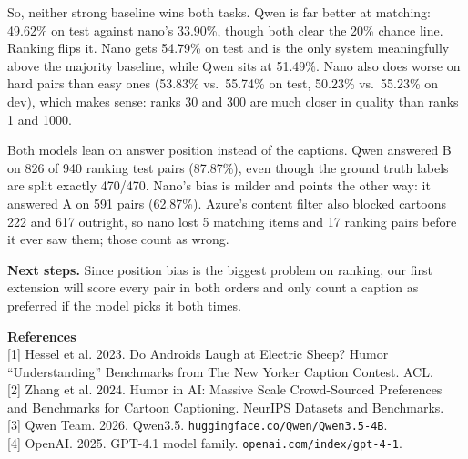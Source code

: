 \documentclass[10pt]{article}
\begin{document}
So, neither strong baseline wins both tasks. Qwen is far better at matching: 49.62\% on test against nano's 33.90\%, though both clear the 20\% chance line. Ranking flips it. Nano gets 54.79\% on test and is the only system meaningfully above the majority baseline, while Qwen sits at 51.49\%. Nano also does worse on hard pairs than easy ones (53.83\% vs.\ 55.74\% on test, 50.23\% vs.\ 55.23\% on dev), which makes sense: ranks 30 and 300 are much closer in quality than ranks 1 and 1000. \par

Both models lean on answer position instead of the captions. Qwen answered B on 826 of 940 ranking test pairs (87.87\%), even though the ground truth labels are split exactly 470/470. Nano's bias is milder and points the other way: it answered A on 591 pairs (62.87\%). Azure's content filter also blocked cartoons 222 and 617 outright, so nano lost 5 matching items and 17 ranking pairs before it ever saw them; those count as wrong. \par

\textbf{Next steps.} Since position bias is the biggest problem on ranking, our first extension will score every pair in both orders and only count a caption as preferred if the model picks it both times. \par

\vspace{-0.5em}
{\small
\textbf{References}\\
{[1]} Hessel et al. 2023. Do Androids Laugh at Electric Sheep? Humor ``Understanding'' Benchmarks from The New Yorker Caption Contest. ACL.\\
{[2]} Zhang et al. 2024. Humor in AI: Massive Scale Crowd-Sourced Preferences and Benchmarks for Cartoon Captioning. NeurIPS Datasets and Benchmarks.\\
{[3]} Qwen Team. 2026. Qwen3.5. \texttt{huggingface.co/Qwen/Qwen3.5-4B}.\\
{[4]} OpenAI. 2025. GPT-4.1 model family. \texttt{openai.com/index/gpt-4-1}.\par}
\end{document}
